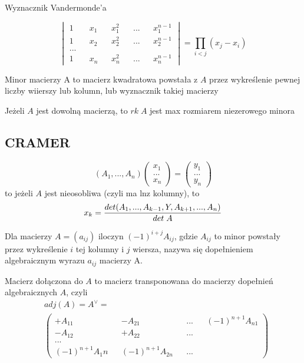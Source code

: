 \documentclass{article}
\begin{document}
\begin{multicols*}{2}

    {\color{def}Wyznacznik Vandermonde'a}

    $$\begin{vmatrix}1 && x_1 && x_1^2&&...&& x_1^{n-1}\\ 1 && x_2 && x_2^2 && ... && x_2^{n-1}\\...\\ 1 && x_n && x_n^2 && ... && x_n^{n-1}\end{vmatrix}=\prod\limits_{i<j}(x_j-x_i)$$


    {\color{def}Minor macierzy A} to macierz kwadratowa powstała z $A$ przez wykreślenie pewnej liczby wiierszy lub kolumn, lub wyznacznik takiej macierzy\bigskip

    Jeżeli $A$ jest dowolną macierzą, to $rk\;A$ jest max rozmiarem niezerowego minora

    \subsection*{CRAMER}
    $$(A_1, ..., A_n)\begin{pmatrix}x_1\\...\\x_n\end{pmatrix}=\begin{pmatrix}y_1\\...\\y_n\end{pmatrix}$$
    to jeżeli $A$ jest nieosobliwa (czyli ma lnz kolumny), to
    $$x_k={det(A_1, ..., A_{k-1}, Y, A_{k+1}, ..., A_n)\over det\; A}$$


    Dla macierzy $A=(a_{ij})$ iloczyn $(-1)^{i+j}A_{ij}$, gdzie $A_{ij}$ to minor powstały przez wykreślenie $i$ tej kolumny i $j$ wiersza, nazywa się {\color{def}dopełnieniem algebraicznym} wyrazu $a_{ij}$ macierzy A.\bigskip

    {\color{def}Macierz dołączona do $A$} to macierz transponowana do macierzy dopełnień algebraicznych $A$, czyli
    \begin{align*}&adj(A)=A^\lor=\\
        &\begin{pmatrix}+A_{11}&&-A_{21}&&...&&(-1)^{n+1}A_{n1}\\-A_{12}&&+A_{22}&&...\\
        ...\\
        (-1)^{n+1}A_1n&&(-1)^{n+1}A_{2n}&&...\end{pmatrix}\end{align*}



\end{multicols*}
\end{document}
